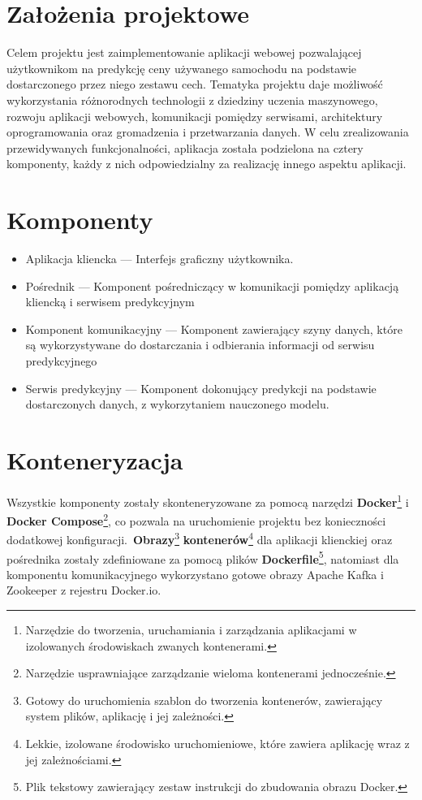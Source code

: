 \documentclass[12pt, a4paper]{report}
\begin{document}
\section{Założenia projektowe}
Celem projektu jest zaimplementowanie aplikacji webowej pozwalającej użytkownikom na predykcję 
ceny używanego samochodu na podstawie dostarczonego przez niego zestawu cech. Tematyka projektu
daje możliwość wykorzystania różnorodnych technologii z dziedziny uczenia maszynowego, rozwoju
aplikacji webowych, komunikacji pomiędzy serwisami, architektury oprogramowania oraz gromadzenia i 
przetwarzania danych. W celu zrealizowania przewidywanych funkcjonalności, aplikacja została
podzielona na cztery komponenty, każdy z nich odpowiedzialny za realizację innego aspektu
aplikacji.
\section{Komponenty}
\begin{itemize}
    \item Aplikacja kliencka --- Interfejs graficzny użytkownika.
    \item Pośrednik --- Komponent pośredniczący w komunikacji pomiędzy aplikacją kliencką i serwisem predykcyjnym
    \item Komponent komunikacyjny --- Komponent zawierający szyny danych, które są wykorzystywane do dostarczania i odbierania informacji od serwisu predykcyjnego
    \item Serwis predykcyjny --- Komponent dokonujący predykcji na podstawie dostarczonych danych, z wykorzytaniem nauczonego modelu.
\end{itemize}

\section{Konteneryzacja}
Wszystkie komponenty zostały skonteneryzowane za pomocą narzędzi
\textbf{Docker}\footnote{Narzędzie do tworzenia, uruchamiania i zarządzania aplikacjami w izolowanych środowiskach zwanych kontenerami.}
i \textbf{Docker Compose}\footnote{Narzędzie usprawniające zarządzanie wieloma kontenerami jednocześnie.}, co pozwala na uruchomienie projektu
bez konieczności dodatkowej konfiguracji.\ \textbf{Obrazy}\footnote{Gotowy do uruchomienia szablon do tworzenia kontenerów, zawierający system plików, aplikację i jej zależności.}
\textbf{kontenerów}\footnote{Lekkie, izolowane środowisko uruchomieniowe, które zawiera aplikację wraz z jej zależnościami.}
dla aplikacji klienckiej oraz pośrednika zostały zdefiniowane za pomocą
plików \textbf{Dockerfile}\footnote{Plik tekstowy zawierający zestaw instrukcji do zbudowania obrazu Docker.},
natomiast dla komponentu komunikacyjnego wykorzystano gotowe obrazy Apache Kafka i Zookeeper z rejestru Docker.io.
\end{document}
